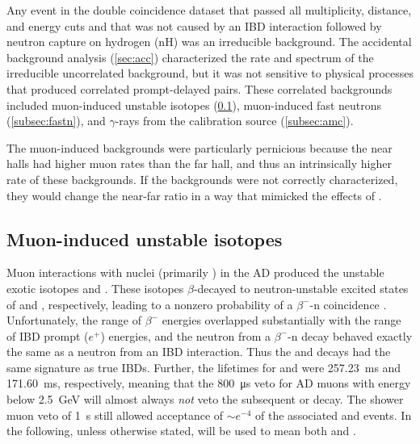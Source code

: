 Any event in the double coincidence dataset
that passed all multiplicity, distance, and energy cuts
and that was not caused by an IBD interaction followed by
neutron capture on hydrogen (nH)
was an irreducible background.
The accidental background analysis (\cref{sec:acc})
characterized the rate and spectrum of
the irreducible uncorrelated background,
but it was not sensitive to physical processes that produced
correlated prompt-delayed pairs.
These correlated backgrounds included muon-induced unstable isotopes (\cref{subsec:li9}),
muon-induced fast neutrons (\cref{subsec:fastn}),
and $\gamma$-rays from the \amc{} calibration source (\cref{subsec:amc}).

The muon-induced backgrounds were particularly pernicious
because the near halls had higher muon rates than the far hall,
and thus an intrinsically higher rate of these backgrounds.
If the backgrounds were not correctly characterized,
they would change the near-far ratio in a way that mimicked the effects of \thetaot.

\subsection{Muon-induced unstable isotopes}
\label{subsec:li9}

Muon interactions with nuclei (primarily ) in the AD
produced the unstable exotic isotopes \li{} and \he{}.
These isotopes $\beta$-decayed to neutron-unstable excited states
of  and , respectively,
leading to a nonzero probability of a $\beta^{-}$-n coincidence \cite{kamland_li9}.
Unfortunately, the range of $\beta^-$ energies overlapped substantially
with the range of IBD prompt ($e^+$) energies,
and the neutron from a $\beta^-$-n decay behaved
exactly the same as a neutron from an IBD interaction.
Thus the \li{} and \he{} decays had the same signature as true IBDs.
Further, the lifetimes for \li{} and \he{} were
\SI{257.23}{\ms} and \SI{171.60}{\ms}, respectively,
meaning that the \SI{800}{\us} veto for AD muons
with energy below \SI{2.5}{\GeV} will almost always
\emph{not} veto the subsequent \li{} or \he{} decay.
The shower muon veto of \SI{1}{\s} still allowed acceptance of
$\sim e^{-4}$ of the associated \li{} and \he{} events.
In the following, unless otherwise stated,
\li{} will be used to mean both \li{} and \he{}.

